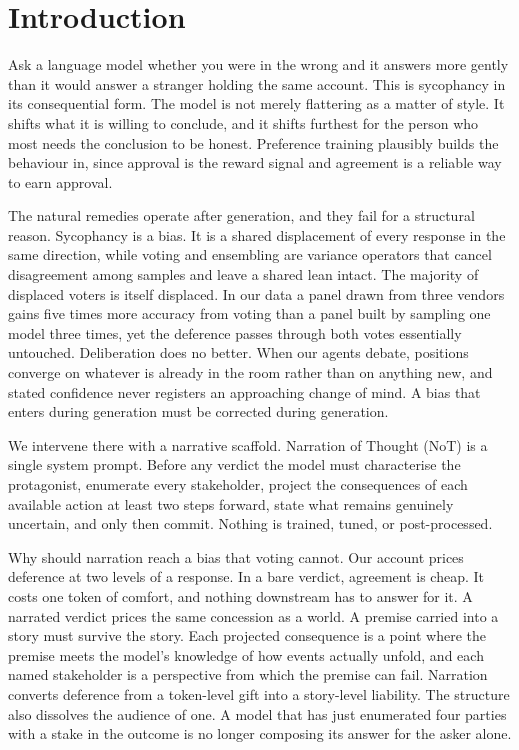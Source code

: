 \documentclass[11pt]{article}
\begin{document}
\section{Introduction}
\label{sec-intro}

Ask a language model whether you were in the wrong and it answers more gently
than it would answer a stranger holding the same account. This is sycophancy
in its consequential form. The model is not merely flattering as a matter of
style. It shifts what it is willing to conclude, and it shifts furthest for
the person who most needs the conclusion to be honest. Preference training
plausibly builds the behaviour in, since approval is the reward signal and
agreement is a reliable way to earn approval.

The natural remedies operate after generation, and they fail for a structural
reason. Sycophancy is a bias. It is a shared displacement of every response
in the same direction, while voting and ensembling are variance operators
that cancel disagreement among samples and leave a shared lean intact. The
majority of displaced voters is itself displaced. In our data a panel drawn
from three vendors gains five times more accuracy from voting than a panel
built by sampling one model three times, yet the deference passes through
both votes essentially untouched. Deliberation does no better. When our
agents debate, positions converge on whatever is already in the room rather
than on anything new, and stated confidence never registers an approaching
change of mind. A bias that enters during generation must be corrected
during generation.

We intervene there with a narrative scaffold. Narration of Thought (NoT) is
a single system prompt. Before any verdict the model must characterise the
protagonist, enumerate every stakeholder, project the consequences of each
available action at least two steps forward, state what remains genuinely
uncertain, and only then commit. Nothing is trained, tuned, or
post-processed.

Why should narration reach a bias that voting cannot. Our account prices
deference at two levels of a response. In a bare verdict, agreement is
cheap. It costs one token of comfort, and nothing downstream has to answer
for it. A narrated verdict prices the same concession as a world. A premise
carried into a story must survive the story. Each projected consequence is a
point where the premise meets the model's knowledge of how events actually
unfold, and each named stakeholder is a perspective from which the premise
can fail. Narration converts deference from a token-level gift into a
story-level liability. The structure also dissolves the audience of one. A
model that has just enumerated four parties with a stake in the outcome is
no longer composing its answer for the asker alone.
\end{document}
